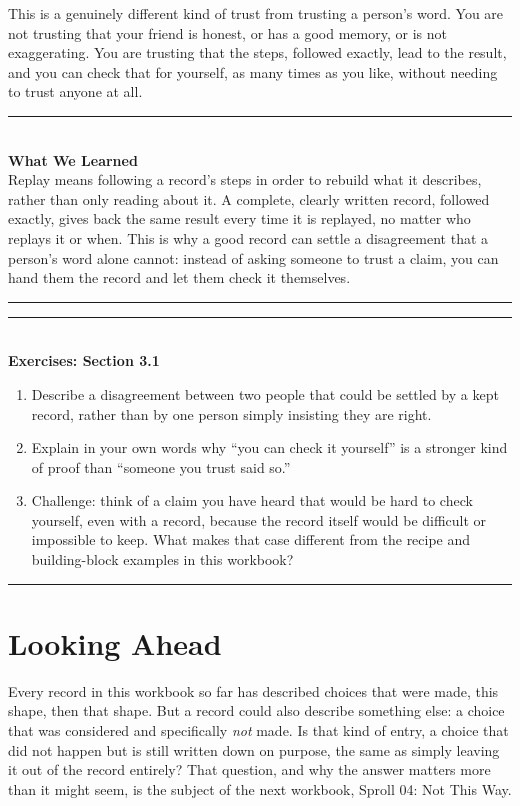 \documentclass[11pt]{book}
\newenvironment{exercisebox}[1]{%
\vspace{0.8em}\noindent\rule{\linewidth}{0.6pt}\\[0.2em]\textbf{Exercises: #1}\\[0.3em]%
\begin{enumerate}[label=\arabic*., itemsep=0.4em]}%
{\end{enumerate}\noindent\rule{\linewidth}{0.6pt}\vspace{0.6em}}
\newenvironment{summarybox}{%
\vspace{0.6em}\noindent\rule{\linewidth}{0.6pt}\\[0.2em]\textbf{What We Learned}\\[0.3em]}%
{\\[0.2em]\noindent\rule{\linewidth}{0.6pt}\vspace{0.6em}}
\begin{document}
This is a genuinely different kind of trust from trusting a person's word. You are not trusting that your friend is honest, or has a good memory, or is not exaggerating. You are trusting that the steps, followed exactly, lead to the result, and you can check that for yourself, as many times as you like, without needing to trust anyone at all.

\begin{summarybox}
Replay means following a record's steps in order to rebuild what it describes, rather than only reading about it. A complete, clearly written record, followed exactly, gives back the same result every time it is replayed, no matter who replays it or when. This is why a good record can settle a disagreement that a person's word alone cannot: instead of asking someone to trust a claim, you can hand them the record and let them check it themselves.
\end{summarybox}

\begin{exercisebox}{Section 3.1}
\item Describe a disagreement between two people that could be settled by a kept record, rather than by one person simply insisting they are right.
\item Explain in your own words why ``you can check it yourself'' is a stronger kind of proof than ``someone you trust said so.''
\item Challenge: think of a claim you have heard that would be hard to check yourself, even with a record, because the record itself would be difficult or impossible to keep. What makes that case different from the recipe and building-block examples in this workbook?
\end{exercisebox}

\chapter*{Looking Ahead}

Every record in this workbook so far has described choices that were made, this shape, then that shape. But a record could also describe something else: a choice that was considered and specifically \emph{not} made. Is that kind of entry, a choice that did not happen but is still written down on purpose, the same as simply leaving it out of the record entirely? That question, and why the answer matters more than it might seem, is the subject of the next workbook, Sproll 04: Not This Way.
\end{document}
